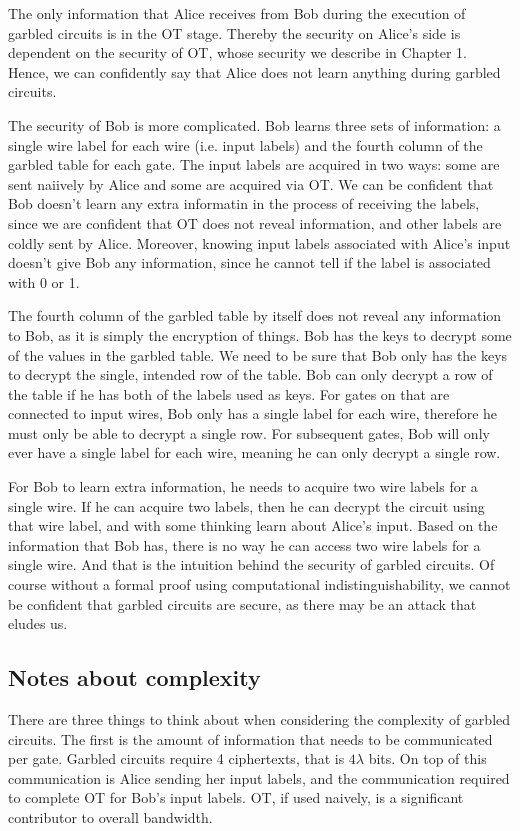 The only information that Alice receives from Bob during the execution of garbled circuits is in the OT stage.
Thereby the security on Alice's side is dependent on the security of OT, whose security we describe in Chapter 1.
Hence, we can confidently say that Alice does not learn anything during garbled circuits.

The security of Bob is more complicated.
Bob learns three sets of information: a single wire label for each wire (i.e. input labels)  and the fourth column of the garbled table for each gate.
The input labels are acquired in two ways: some are sent naiively by Alice and some are acquired via OT.
We can be confident that Bob doesn't learn any extra informatin in the process of receiving the labels, since we are confident that OT does not reveal information, and other labels are coldly sent by Alice.
Moreover, knowing input labels associated with Alice's input doesn't give Bob any information, since he cannot tell if the label is associated with 0 or 1.

The fourth column of the garbled table by itself does not reveal any information to Bob, as it is simply the encryption of things.
Bob has the keys to decrypt some of the values in the garbled table.
We need to be sure that Bob only has the keys to decrypt the single, intended row of the table.
Bob can only decrypt a row of the table if he has both of the labels used as keys.
For gates on that are connected to input wires, Bob only has a single label for each wire, therefore he must only be able to decrypt a single row.
For subsequent gates, Bob will only ever have a single label for each wire, meaning he can only decrypt a single row.

For Bob to learn extra information, he needs to acquire two wire labels for a single wire.
If he can acquire two labels, then he can decrypt the circuit using that wire label, and with some thinking learn about Alice's input.
Based on the information that Bob has, there is no way he can access two wire labels for a single wire.
And that is the intuition behind the security of garbled circuits.
Of course without a formal proof using computational indistinguishability, we cannot be confident that garbled circuits are secure, as there may be an attack that eludes us.

\subsection{Notes about complexity}
There are three things to think about when considering the complexity of garbled circuits.
The first is the amount of information that needs to be communicated per gate.
Garbled circuits require 4 ciphertexts, that is $4\lambda$ bits.
On top of this communication is Alice sending her input labels, and the communication required to complete OT for Bob's input labels.
OT, if used naively, is a significant contributor to overall bandwidth.

